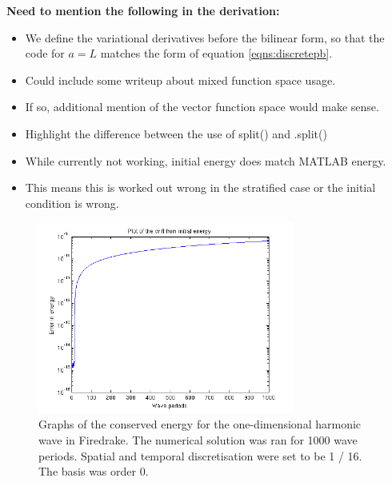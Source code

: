 \documentclass[a4paper,11pt]{article}
\begin{document}
\textbf{ Need to mention the following in the derivation:} 
\begin{itemize}
\item We define the variational derivatives before the bilinear form, so that the code for $ a = L$ matches the form of equation \eqref{eqns:discretepb}.
\item Could include some writeup about mixed function space usage.
\item If so, additional mention of the vector function space would make sense.
\item Highlight the difference between the use of split() and .split()
\item While currently not working, initial energy does match MATLAB energy.
\item This means this is worked out  wrong in the stratified case or the initial condition is wrong.
\end{itemize}


\begin{figure}
    \centering
    \includegraphics[width=0.75\textwidth]{error1dfd.png}
       \caption{Graphs of the conserved energy for the one-dimensional harmonic wave in Firedrake. The numerical solution was ran for 1000 wave periods. Spatial and temporal  discretisation were set to be 1 / 16. The basis was order 0.}
        \label{test}
\end{figure}
\end{document}
